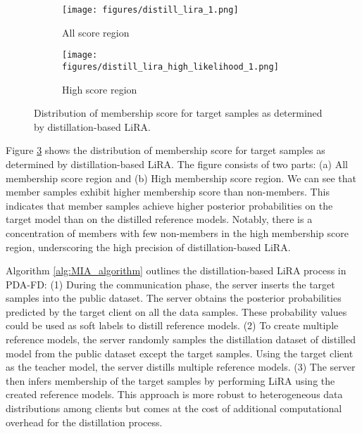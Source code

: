 \begin{figure}[h]
\centering
  \begin{subfigure}[m]{0.49\linewidth}
    \texttt{[image: figures/distill\_lira\_1.png]}
    \caption{All score region}
    \label{fig:distill_lira_overall}
  \end{subfigure}
  \begin{subfigure}[m]{0.49\linewidth}
    \texttt{[image: figures/distill\_lira\_high\_likelihood\_1.png]}
    \caption{High score region}
    \label{fig:distill_lira_high}
  \end{subfigure}
  \caption{Distribution of membership score for target samples as determined by distillation-based LiRA.}
  \label{fig:distll_lira}
\end{figure}
Figure \ref{fig:distll_lira} shows the distribution of membership score for target samples as determined by distillation-based LiRA. 
The figure consists of two parts: (a) All membership score region and (b) High membership score region.
We can see that member samples exhibit higher membership score than non-members. This indicates that member samples achieve higher posterior probabilities on the target model than on the distilled reference models. 
Notably, there is a concentration of members with few non-members in the high membership score region, underscoring the high precision of distillation-based LiRA.
\fi


Algorithm \ref{alg:MIA_algorithm} outlines the distillation-based LiRA process in PDA-FD:
(1) During the communication phase, the server inserts the target samples into the public dataset.
The server obtains the posterior probabilities predicted by the target client on all the data samples. 
These probability values could be used as soft labels to distill reference models.
(2) To create multiple reference models, the server randomly samples the distillation dataset of distilled model from the public dataset except the target samples. Using the target client as the teacher model, the server distills multiple reference models.
(3) The server then infers membership of the target samples by performing LiRA using the created reference models.
This approach is more robust to heterogeneous data distributions among clients but comes at the cost of additional computational overhead for the distillation process.
